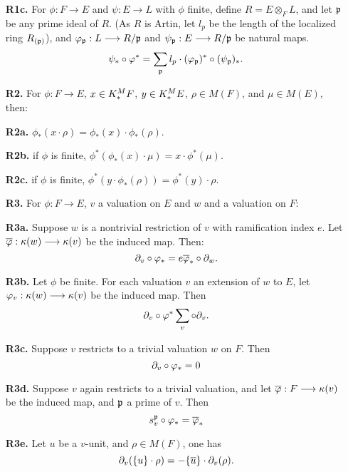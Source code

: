 \begin{definition}
\begin{enumerate}
\item[\textbf{R1c.}] For $\phi: F \to E$ and $\psi: E \to L$ with
$\phi$ finite, define $R = E \otimes_F L$, and let $\mathfrak{p}$
be any prime ideal of $R$. (As $R$ is Artin, let $l_p$ be the 
length of the localized ring $R_{(\mathfrak{p})}$), and 
$\varphi_{\mathfrak{p}}: L \longrightarrow R/{\mathfrak{p}}$ and 
$\psi_{\mathfrak{p}}: E \longrightarrow R/{\mathfrak{p}}$ be natural maps.
\[
\psi_*\circ \varphi^* = \sum_{\mathfrak{p}} l_p \cdot 
(\varphi_{\mathfrak{p}})^* \circ (\psi_{\mathfrak{p}})_*.
\]

\item[\textbf{R2.}] For $\phi: F \to E$, $x \in K^M_*F$, $y \in
K^M_*E$, $\rho \in M(F)$, and $\mu \in M(E)$, then:

\item[\textbf{R2a.}] $\phi_*(x \cdot \rho) = \phi_*(x) \cdot 
\phi_*(\rho)$.

\item[\textbf{R2b.}] if $\phi$ is finite, $\phi^*(\phi_*(x) \cdot 
\mu) = x \cdot \phi^*(\mu)$.

\item[\textbf{R2c.}] if $\phi$ is finite, $\phi^*(y \cdot 
\phi_*(\rho)) = \phi^*(y) \cdot \rho$.

\item[\textbf{R3.}] For $\phi: F \to E$, $v$ a valuation on $E$
and $w$ and a valuation on $F$:

\item[\textbf{R3a.}] Suppose $w$ is a nontrivial restriction of 
$v$ with ramification index $e$. Let $\overline{\varphi}: \kappa(w) \longrightarrow 
\kappa(v)$ be the induced map. Then:
\[
\partial_{v} \circ \varphi_* = e \overline{\varphi}_* \circ \partial_{w}.
\]

\item[\textbf{R3b.}] Let $\phi$ be finite. For each valuation $v$ 
an extension of $w$ to $E$, let $\varphi_v: \kappa(w) \longrightarrow \kappa(v)$
be the induced map. Then
\[
\partial_{v} \circ \varphi^* \sum_{v} \circ \partial_{v}.
\]

\item[\textbf{R3c.}] Suppose $v$ restricts to a trivial valuation
$w$ on $F$. Then
\[
\partial_{v} \circ \varphi_* = 0
\]

\item[\textbf{R3d.}] Suppose $v$ again restricts to a trivial 
valuation, and let $\overline{\varphi}: F \longrightarrow \kappa(v)$ be the induced map, and
$\mathfrak{p}$ a prime of $v$. Then
\[
s_{v}^{\mathfrak{p}} \circ \varphi_* = \overline{\varphi}_*
\]

\item[\textbf{R3e.}] Let $u$ be a $v$-unit, and $\rho \in M(F)$,
one has
\[
\partial_{v}(\{u\} \cdot \rho) = -\{\overline{u}\} \cdot \partial_{v}(\rho).
\]
\end{enumerate}
\end{definition}

